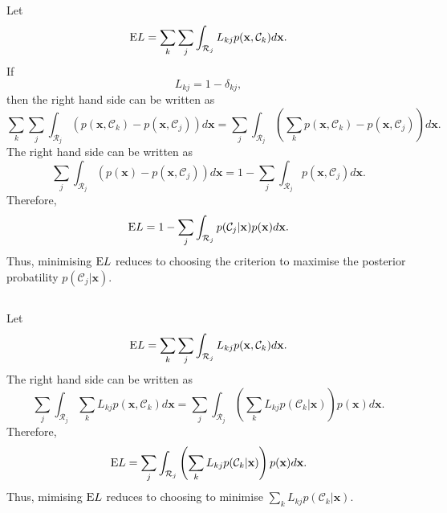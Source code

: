\subsection{}
Let
%
\begin{equation}
{\rm E} L = \sum_{k} \sum_{j} \int_{\mathcal{R}_j} L_{kj} p(\mathbf{x}, \mathcal{C}_k) d\mathbf{x}.
\end{equation}
%
If
%
\begin{equation}
L_{kj} = 1 - \delta_{kj},
\end{equation}
%
then the right hand side can be written as
%
\begin{equation}
\sum_{k} \sum_{j} \int_{\mathcal{R}_j} \left( p(\mathbf{x}, \mathcal{C}_k) - p(\mathbf{x}, \mathcal{C}_j) \right)  d\mathbf{x} = \sum_{j} \int_{\mathcal{R}_j} \left( \sum_{k} p(\mathbf{x}, \mathcal{C}_k) - p(\mathbf{x}, \mathcal{C}_j) \right)  d\mathbf{x}.
\end{equation}
%
The right hand side can be written as
%
\begin{equation}
\sum_{j} \int_{\mathcal{R}_j} \left( p(\mathbf{x}) - p(\mathbf{x}, \mathcal{C}_j) \right)  d\mathbf{x} = 1 - \sum_{j} \int_{\mathcal{R}_j} p(\mathbf{x}, \mathcal{C}_j) d\mathbf{x}.
\end{equation}
%
Therefore,
%
\begin{equation}
{\rm E} L = 1 - \sum_{j} \int_{\mathcal{R}_j} p(\mathcal{C}_j | \mathbf{x}) p(\mathbf{x}) d\mathbf{x}.
\end{equation}
%
Thus, minimising ${\rm E} L$ reduces to choosing the criterion to maximise the posterior probatility $p(\mathcal{C}_j | \mathbf{x})$.


\subsection{}
Let
%
\begin{equation}
{\rm E} L = \sum_{k} \sum_{j} \int_{\mathcal{R}_j} L_{kj} p(\mathbf{x}, \mathcal{C}_k) d\mathbf{x}.
\end{equation}
%
The right hand side can be written as
%
\begin{equation}
\sum_{j} \int_{\mathcal{R}_j} \sum_{k} L_{kj} p(\mathbf{x}, \mathcal{C}_k) d\mathbf{x} = \sum_{j} \int_{\mathcal{R}_j} \left( \sum_{k} L_{kj} p(\mathcal{C}_k | \mathbf{x}) \right) p(\mathbf{x}) d\mathbf{x}.
\end{equation}
%
Therefore,
%
\begin{equation}
{\rm E} L = \sum_{j} \int_{\mathcal{R}_j} \left( \sum_{k} L_{kj} p(\mathcal{C}_k | \mathbf{x}) \right) p(\mathbf{x}) d\mathbf{x}.
\end{equation}
%
Thus, mimising ${\rm E} L$ reduces to choosing to minimise $\sum_{k} L_{kj} p(\mathcal{C}_k | \mathbf{x})$.


